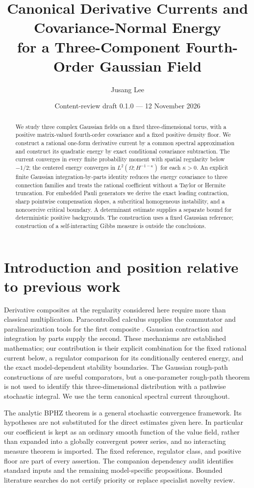\documentclass[11pt]{article}
\title{Canonical Derivative Currents and Covariance-Normal Energy\protect\\for a Three-Component Fourth-Order Gaussian Field}
\author{Jusang Lee}
\date{Content-review draft 0.1.0 --- 12 November 2026}
\begin{document}
\maketitle
\begin{abstract}
We study three complex Gaussian fields on a fixed three-dimensional torus,
with a positive matrix-valued fourth-order covariance and a fixed positive
density floor. We construct a rational one-form derivative current by a
common spectral approximation and construct its quadratic energy by exact
conditional covariance subtraction. The current converges in every finite
probability moment with spatial regularity below $-1/2$; the centered energy
converges in $L^2(\Omega;H^{-1-\kappa})$ for each $\kappa>0$.
An explicit finite Gaussian integration-by-parts identity reduces the energy
covariance to three connection families and treats the rational coefficient
without a Taylor or Hermite truncation. For embedded Pauli generators we
derive the exact leading contraction, sharp pointwise compensation slopes,
a subcritical homogeneous instability, and a noncoercive critical boundary.
A determinant estimate supplies a separate bound for deterministic positive
backgrounds. The construction uses a fixed Gaussian reference; construction
of a self-interacting Gibbs measure is outside the conclusions.
\end{abstract}

\section{Introduction and position relative to previous work}
Derivative composites at the regularity considered here require more than
classical multiplication. Paracontrolled calculus supplies the commutator
and paralinearization tools for the first composite \cite{GIP}. Gaussian
contraction and integration by parts supply the second. These mechanisms
are established mathematics; our contribution is their explicit combination
for the fixed rational current below, a regulator comparison for its
conditionally centered energy, and the exact model-dependent stability
boundaries. The Gaussian rough-path constructions of \cite{FV} are useful
comparators, but a one-parameter rough-path theorem is not used to identify
this three-dimensional distribution with a pathwise stochastic integral.
We use the term canonical spectral current throughout.

The analytic BPHZ theorem \cite{CH} is a general stochastic convergence
framework. Its hypotheses are not substituted for the direct estimates
given here. In particular our coefficient is kept as an ordinary smooth
function of the value field, rather than expanded into a globally convergent
power series, and no interacting measure theorem is imported. The fixed
reference, regulator class, and positive floor are part of every assertion.
The companion dependency audit identifies standard inputs and the remaining
model-specific propositions. Bounded literature searches do not certify
priority or replace specialist novelty review.
\end{document}
